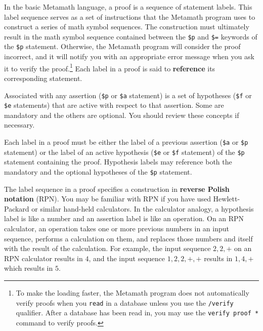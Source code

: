In the basic Metamath language, a proof is a
sequence of statement labels.  This label sequence
serves as a set of instructions that the Metamath program uses to
construct a series of math symbol sequences.  The construction must
ultimately result in the math symbol sequence contained between the
\texttt{\$p} and
\texttt{\$=} keywords of the \texttt{\$p}
statement.  Otherwise, the Metamath program will consider the proof
incorrect, and it will notify you with an appropriate error message when
you ask it to verify the proof.\footnote{To make the loading faster, the
Metamath program does not automatically verify proofs when you
\texttt{read} in a database unless you use the \texttt{/verify}
qualifier.  After a database has been read in, you may use the
\texttt{verify proof *} command to verify proofs.} Each label in a proof is said to {\bf
reference} its corresponding statement.

Associated with any assertion (\texttt{\$p} or
\texttt{\$a} statement) is a set of
hypotheses (\texttt{\$f} or
\texttt{\$e} statements) that are active
with respect to that assertion.  Some are mandatory and the others are
optional.  You should review these concepts if necessary.

Each label in a proof must be either the label of a
previous assertion (\texttt{\$a} or
\texttt{\$p} statement) or the label of an
active hypothesis (\texttt{\$e} or \texttt{\$f} statement) of the \texttt{\$p} statement containing the
proof.  Hypothesis labels may reference both the
mandatory and the optional hypotheses of the
\texttt{\$p} statement.

The label sequence in a proof specifies a construction in {\bf reverse Polish
notation} (RPN).  You may be familiar
with RPN if you have used Hewlett-Packard or similar hand-held calculators.
In the calculator analogy, a hypothesis label is like
a number and an assertion label is like an operation.
On an RPN calculator, an operation takes one or more previous numbers in an
input sequence, performs a calculation on them, and replaces those numbers and
itself with the result of the calculation.  For example, the input sequence
$2,2,+$ on an RPN calculator results in $4$, and the input sequence
$1,2,2,+,+$ results in $1,4,+$ which results in $5$.


